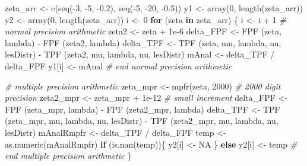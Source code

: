 \documentclass[
]{book}
\newenvironment{Shaded}{\begin{snugshade}}{\end{snugshade}}
\newcommand{\CommentTok}[1]{\textcolor[rgb]{0.56,0.35,0.01}{\textit{#1}}}
\newcommand{\ConstantTok}[1]{\textcolor[rgb]{0.00,0.00,0.00}{#1}}
\newcommand{\ControlFlowTok}[1]{\textcolor[rgb]{0.13,0.29,0.53}{\textbf{#1}}}
\newcommand{\DecValTok}[1]{\textcolor[rgb]{0.00,0.00,0.81}{#1}}
\newcommand{\FloatTok}[1]{\textcolor[rgb]{0.00,0.00,0.81}{#1}}
\newcommand{\FunctionTok}[1]{\textcolor[rgb]{0.00,0.00,0.00}{#1}}
\newcommand{\NormalTok}[1]{#1}
\newcommand{\OtherTok}[1]{\textcolor[rgb]{0.56,0.35,0.01}{#1}}
\newcommand{\SpecialCharTok}[1]{\textcolor[rgb]{0.00,0.00,0.00}{#1}}
\begin{document}
\begin{Shaded}
\begin{Highlighting}[]
\NormalTok{zeta\_arr }\OtherTok{\textless{}{-}} \FunctionTok{c}\NormalTok{(}\FunctionTok{seq}\NormalTok{(}\SpecialCharTok{{-}}\DecValTok{3}\NormalTok{, }\SpecialCharTok{{-}}\DecValTok{5}\NormalTok{, }\SpecialCharTok{{-}}\FloatTok{0.2}\NormalTok{), }\FunctionTok{seq}\NormalTok{(}\SpecialCharTok{{-}}\DecValTok{5}\NormalTok{, }\SpecialCharTok{{-}}\DecValTok{20}\NormalTok{, }\SpecialCharTok{{-}}\FloatTok{0.5}\NormalTok{))}
\NormalTok{y1 }\OtherTok{\textless{}{-}} \FunctionTok{array}\NormalTok{(}\DecValTok{0}\NormalTok{, }\FunctionTok{length}\NormalTok{(zeta\_arr))}
\NormalTok{y2 }\OtherTok{\textless{}{-}} \FunctionTok{array}\NormalTok{(}\DecValTok{0}\NormalTok{, }\FunctionTok{length}\NormalTok{(zeta\_arr))}
\NormalTok{i }\OtherTok{\textless{}{-}} \DecValTok{0}
\ControlFlowTok{for}\NormalTok{ (zeta }\ControlFlowTok{in}\NormalTok{ zeta\_arr) \{}
\NormalTok{  i }\OtherTok{\textless{}{-}}\NormalTok{ i }\SpecialCharTok{+} \DecValTok{1}
  \CommentTok{\# normal precision arithmetic}
\NormalTok{  zeta2 }\OtherTok{\textless{}{-}}\NormalTok{ zeta }\SpecialCharTok{+} \FloatTok{1e{-}6}
\NormalTok{  delta\_FPF }\OtherTok{\textless{}{-}} \FunctionTok{FPF}\NormalTok{ (zeta, lambda) }\SpecialCharTok{{-}} \FunctionTok{FPF}\NormalTok{ (zeta2, lambda)}
\NormalTok{  delta\_TPF }\OtherTok{\textless{}{-}} \FunctionTok{TPF}\NormalTok{ (zeta, mu, lambda, nu, lesDistr) }\SpecialCharTok{{-}} 
    \FunctionTok{TPF}\NormalTok{ (zeta2, mu, lambda, nu, lesDistr)}
\NormalTok{  mAnal }\OtherTok{\textless{}{-}}\NormalTok{ delta\_TPF }\SpecialCharTok{/}\NormalTok{ delta\_FPF}
\NormalTok{  y1[i] }\OtherTok{\textless{}{-}}\NormalTok{ mAnal}
  \CommentTok{\# end normal precision arithmetic}
  
  \CommentTok{\# multiple precision arithmetic}
\NormalTok{  zeta\_mpr }\OtherTok{\textless{}{-}} \FunctionTok{mpfr}\NormalTok{(zeta, }\DecValTok{2000}\NormalTok{) }\CommentTok{\# 2000 digit precision}
\NormalTok{  zeta2\_mpr }\OtherTok{\textless{}{-}}\NormalTok{ zeta\_mpr }\SpecialCharTok{+} \FloatTok{1e{-}12} \CommentTok{\# small increment}
\NormalTok{  delta\_FPF }\OtherTok{\textless{}{-}} \FunctionTok{FPF}\NormalTok{ (zeta\_mpr, lambda) }\SpecialCharTok{{-}} \FunctionTok{FPF}\NormalTok{ (zeta2\_mpr, lambda)}
\NormalTok{  delta\_TPF }\OtherTok{\textless{}{-}} \FunctionTok{TPF}\NormalTok{ (zeta\_mpr, mu, lambda, nu, lesDistr) }\SpecialCharTok{{-}} 
    \FunctionTok{TPF}\NormalTok{ (zeta2\_mpr, mu, lambda, nu, lesDistr)}
\NormalTok{  mAnalRmpfr }\OtherTok{\textless{}{-}}\NormalTok{ delta\_TPF }\SpecialCharTok{/}\NormalTok{ delta\_FPF}
\NormalTok{  temp }\OtherTok{\textless{}{-}} \FunctionTok{as.numeric}\NormalTok{(mAnalRmpfr)}
  \ControlFlowTok{if}\NormalTok{ (}\FunctionTok{is.nan}\NormalTok{(temp))\{}
\NormalTok{    y2[i] }\OtherTok{\textless{}{-}} \ConstantTok{NA}
\NormalTok{  \} }\ControlFlowTok{else}\NormalTok{ y2[i] }\OtherTok{\textless{}{-}}\NormalTok{ temp }
  \CommentTok{\# end multiple precision arithmetic}
\NormalTok{\}}
\end{Highlighting}
\end{Shaded}
\end{document}
